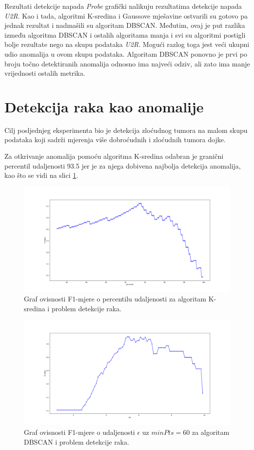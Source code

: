 \documentclass[utf8, diplomski, numeric]{fer}
\begin{document}
Rezultati detekcije napada \textit{Probe} grafički nalikuju rezultatima detekcije napada \textit{U2R}. Kao i tada, algoritmi K-sredina i Gaussove mješavine ostvarili su gotovo pa jednak rezultat i nadmašili su algoritam DBSCAN. Međutim, ovaj je put razlika između algoritma DBSCAN i ostalih algoritama manja i svi su algoritmi postigli bolje rezultate nego na skupu podataka \textit{U2R}. Mogući razlog toga jest veći ukupni udio anomalija u ovom skupu podataka. Algoritam DBSCAN ponovno je prvi po broju točno detektiranih anomalija odnosno ima najveći odziv, ali zato ima manje vrijednosti ostalih metrika.

\section{Detekcija raka kao anomalije}
Cilj posljednjeg eksperimenta bio je detekcija zloćudnog tumora na malom skupu podataka koji sadrži mjerenja više dobroćudnih i zloćudnih tumora dojke.

Za otkrivanje anomalija pomoću algoritma K-sredina odabran je granični percentil udaljenosti 93.5 jer je za njega dobivena najbolja detekcija anomalija, kao što se vidi na slici \ref{fig:cancer-kmeans}.

\begin{figure}[h!]
\includegraphics[width=1\textwidth]{images/cancer-kmeans-f1.png}
\centering
\caption{Graf ovisnosti F1-mjere o percentilu udaljenosti za algoritam K-sredina i problem detekcije raka.}
\label{fig:cancer-kmeans}
\end{figure}

\begin{figure}[h!]
\includegraphics[width=1\textwidth]{images/cancer-dbscan-f1eps.png}
\centering
\caption{Graf ovisnosti F1-mjere o udaljenosti $\epsilon$ uz $minPts=60$ za algoritam DBSCAN i problem detekcije raka.}
\label{fig:cancer-dbscan1}
\end{figure}
\end{document}
